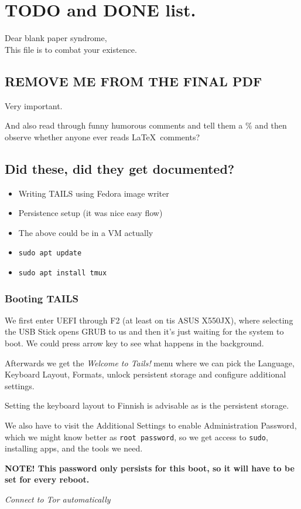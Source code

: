 \documentclass[../wifi-security.tex]{subfiles}
\begin{document}
\chapter{TODO and DONE list.}

Dear blank paper syndrome,\\This file is to combat your existence.

\section*{REMOVE ME FROM THE FINAL PDF}

Very important.

And also read through funny humorous comments and tell them a \% and then observe whether anyone ever reads \LaTeX\ comments?

\section*{Did these, did they get documented?}

\begin{itemize}
	\item{Writing TAILS using Fedora image writer}
	\item{Persistence setup (it was nice easy flow)}
	\item{The above could be in a VM actually}
	\item{\texttt{sudo apt update}}
	\item{\texttt{sudo apt install tmux}}
\end{itemize}

\subsection*{Booting TAILS}

We first enter UEFI through F2 (at least on tis ASUS X550JX), where selecting the USB Stick opens GRUB to us and then it's just waiting for the system to boot. We could press arrow key to see what happens in the background.


Afterwards we get the \textit{Welcome to Tails!} menu where we can pick the Language, Keyboard Layout, Formats, unlock persistent storage and configure additional settings.

Setting the keyboard layout to Finnish is advisable as is the persistent storage.

We also have to visit the Additional Settings to enable Administration Password, which we might know better as \texttt{root password}, so we get access to \texttt{sudo}, installing apps, and the tools we need.

\textbf{NOTE! This password only persists for this boot, so it will have to be set for every reboot.}

\textit{Connect to Tor automatically}
\end{document}
